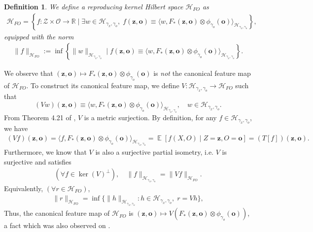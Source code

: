 \documentclass[11pt]{article}
\newcommand{\bz}{\mathbf z}
\newcommand{\bo}{\mathbf o}
\newcommand{\calH}{\mathcal{H}}
\newcommand{\calO}{\mathcal{O}}
\newcommand{\R}{\mathbb{R}}
\newcommand{\0}{\mathbf{0}}
\DeclareMathOperator{\E}{\mathbb{E}}
\newtheorem{defi}{Definition}
\begin{document}
\begin{appendix}
\begin{defi}\label{defi:H_F}
We define a reproducing kernel Hilbert space $\calH_{FO}$ as
\begin{align*}
    \calH_{FO} = \left\{f: \mathcal{Z}\times \calO\to \R\mid \exists w\in \calH_{\gamma_x,\gamma_o}, \; f(\bz,\bo) \equiv \langle w, F_{\ast}(\bz,\bo) \otimes \phi_{\gamma_o}(\bo)\rangle_{\calH_{\gamma_x,\gamma_o}}\right\},
\end{align*}
equipped with the norm
\begin{align*}
    \|f\|_{\calH_{FO}} := \inf\left\{\|w\|_{\calH_{\gamma_x,\gamma_o}}\mid f(\bz,\bo) \equiv \langle w, F_{\ast}(\bz,\bo)\otimes \phi_{\gamma_o}(\bo)\rangle_{\calH_{\gamma_x,\gamma_o}}\right\}.
\end{align*}
\end{defi}
We observe that $(\bz, \bo) \mapsto F_*\left(\bz, \bo \right) \otimes \phi_{\gamma_o}(\bo)$ is \emph{not} the canonical feature map of $\calH_{FO}$. To construct its canonical feature map, we define $V:\calH_{\gamma_x,\gamma_o}\to \calH_{FO}$ such that
\begin{equation*}
    (Vw)(\bz, \bo) \equiv \langle w, F_{\ast}(\bz,\bo)\otimes \phi_{\gamma_o}(\bo)\rangle_{\calH_{\gamma_x,\gamma_o}}, \quad w\in \calH_{\gamma_x,\gamma_o} .
\end{equation*}
From Theorem 4.21 of \cite{steinwart2008support}, $V$ is a metric surjection. 
By definition, for any $f\in \calH_{\gamma_x,\gamma_o}$, we have
\begin{align*}
    (Vf)(\bz,\bo) = \langle f, F_{\ast}(\bz,\bo)\otimes \phi_{\gamma_o}(\bo)\rangle_{\calH_{\gamma_x,\gamma_o}} = \E[f(X,O)\mid Z=\bz, O = \bo] = (T[f])(\bz,\bo).
\end{align*}
Furthermore, we know that $V$ is also a surjective partial isometry, i.e. $V$ is surjective and satisfies
\begin{align*}
    (\forall f\in \ker(V)^{\perp}),\quad\|f\|_{\calH_{\gamma_x,\gamma_o}} = \|Vf\|_{\calH_{FO}}.
\end{align*}
Equivalently, $(\forall r\in \calH_{FO})$,
\begin{align}
\label{eq:r_pseudoinv_norm}
    \|r\|_{\calH_{FO}} = \inf\{\|h\|_{\calH_{\gamma_x,\gamma_o}}: h\in \calH_{\gamma_x,\gamma_o},\;r = Vh\},
\end{align}
Thus, the canonical feature map of $\calH_{FO}$ is $(\bz,\bo)\mapsto V(F_{\ast}(\bz,\bo)\otimes \phi_{\gamma_o}(\bo))$, a fact which was also observed on \citet[Page 28]{meunier2024nonparametricinstrumentalregressionkernel}. 




\end{appendix}
\end{document}
